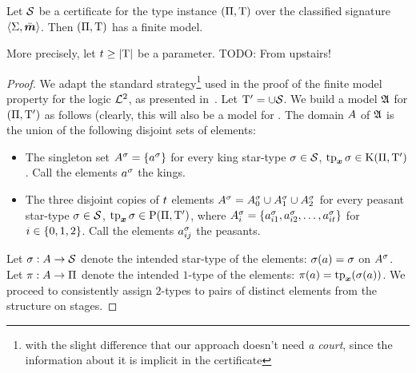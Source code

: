 \begin{lemma}\label{lem:cert-expand}
Let $\mathcal{S}$ be a certificate for the type instance $(\Pi,\mathrm{T})$ over the
classified signature $\left\langle \mathrm{\Sigma},\bar{\bm{m}} \right\rangle$.
Then $(\Pi,\mathrm{T})$ has a finite model.

More precisely, let $t \geq \left|\mathrm{T}\right|$ be a parameter.
TODO: From upstairs!
\end{lemma}
\begin{proof}
We adapt the standard strategy\footnote{with the slight difference that our
approach doesn't need \emph{a court}, since the information about it is implicit
in the certificate} used in the proof of the finite model property for the logic
$\mathcal{L}^{2}$, as presented in~\cite{gradel1999logics}.
Let ${\mathrm{T}'} = \cup\mathcal{S}$.
We build a model $\mathfrak{A}$ for $(\Pi,{\mathrm{T}'})$ as follows (clearly, this will
also be a model for .
The domain $A$ of $\mathfrak{A}$ is the union of the following disjoint sets of
elements:
\begin{itemize}
  \item The singleton set $A^{\sigma} = \left\{a^{\sigma}\right\}$ for every king
  star-type $\sigma\in\mathcal{S}$, $\operatorname{tp}_{\bm{x}}\sigma \in \mathrm{K}(\Pi,{\mathrm{T}'})$.
  Call the elements $a^{\sigma}$ the kings.
  \item The three disjoint copies of $t$ elements
  $A^{\sigma} = A^{\sigma}_{0} \cup A^{\sigma}_{1} \cup A^{\sigma}_{2}$ for every
  peasant star-type $\sigma \in \mathcal{S}$, $\operatorname{tp}_{\bm{x}}\sigma \in \mathrm{P}(\Pi,{\mathrm{T}'})$, where
  $A^{\sigma}_{i} = \left\{a^{\sigma}_{i 1}, a^{\sigma}_{i 2}, \dots, a^{\sigma}_{i t}\right\}$
  for $i \in \left\{0,1,2\right\}$.
  Call the elements $a^{\sigma}_{i j}$ the peasants.
\end{itemize}
Let $\sigma : A \to \mathcal{S}$ denote the intended star-type of the elements:
$\sigma(a) = \sigma$ on $A^{\sigma}$.
Let $\pi : A \to \Pi$ denote the intended $1$-type of the elements:
$\pi(a) = \operatorname{tp}_{\bm{x}}(\sigma(a))$.
We proceed to consistently assign $2$-types to pairs of distinct elements from
the structure on stages.
\end{proof}
